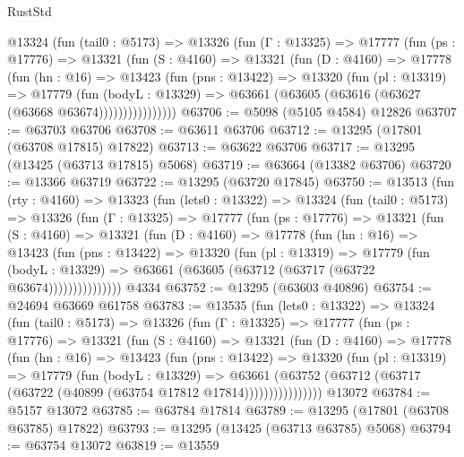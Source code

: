 \begin{lexlean}{RustStd}
\begin{coremodule}
        @13324
          (fun (tail0 : @5173) =>
          @13326
            (fun (Γ : @13325) =>
            @17777
              (fun (ps : @17776) =>
              @13321
                (fun (S : @4160) =>
                @13321
                  (fun (D : @4160) =>
                  @17778
                    (fun (hn : @16) =>
                    @13423
                      (fun (pns : @13422) =>
                      @13320
                        (fun (pl : @13319) =>
                        @17779
                          (fun (bodyL : @13329) =>
                          @63661 (@63605 (@63616 (@63627 (@63668 @63674))))))))))))))))
@63706 := @5098 (@5105 @4584) @12826
@63707 := @63703 @63706
@63708 := @63611 @63706
@63712 := @13295 (@17801 (@63708 @17815) @17822)
@63713 := @63622 @63706
@63717 := @13295 (@13425 (@63713 @17815) @5068)
@63719 := @63664 (@13382 @63706)
@63720 := @13366 @63719
@63722 := @13295 (@63720 @17845)
@63750 := @13513
    (fun (rty : @4160) =>
    @13323
      (fun (lets0 : @13322) =>
      @13324
        (fun (tail0 : @5173) =>
        @13326
          (fun (Γ : @13325) =>
          @17777
            (fun (ps : @17776) =>
            @13321
              (fun (S : @4160) =>
              @13321
                (fun (D : @4160) =>
                @17778
                  (fun (hn : @16) =>
                  @13423
                    (fun (pns : @13422) =>
                    @13320
                      (fun (pl : @13319) =>
                      @17779
                        (fun (bodyL : @13329) =>
                        @63661 (@63605 (@63712 (@63717 (@63722 @63674)))))))))))))))
    @4334
@63752 := @13295 (@63603 @40896)
@63754 := @24694 @63669 @61758
@63783 := @13535
    (fun (lets0 : @13322) =>
    @13324
      (fun (tail0 : @5173) =>
      @13326
        (fun (Γ : @13325) =>
        @17777
          (fun (ps : @17776) =>
          @13321
            (fun (S : @4160) =>
            @13321
              (fun (D : @4160) =>
              @17778
                (fun (hn : @16) =>
                @13423
                  (fun (pns : @13422) =>
                  @13320
                    (fun (pl : @13319) =>
                    @17779
                      (fun (bodyL : @13329) =>
                      @63661
                        (@63752
                          (@63712 (@63717 (@63722 (@40899 (@63754 @17812 @17814))))))))))))))))
    @13072
@63784 := @5157 @13072
@63785 := @63784 @17814
@63789 := @13295 (@17801 (@63708 @63785) @17822)
@63793 := @13295 (@13425 (@63713 @63785) @5068)
@63794 := @63754 @13072
@63819 := @13559

\end{coremodule}
\end{lexlean}
